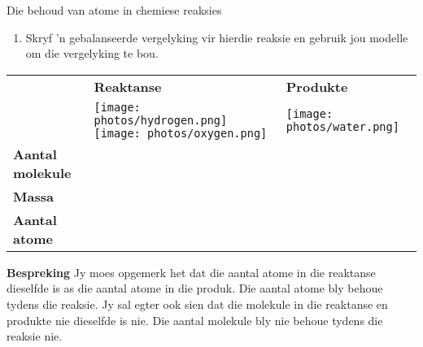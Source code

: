 \begin{activity}{Die behoud van atome in chemiese reaksies}
\begin{enumerate}[noitemsep, label=\textbf{\arabic*}. ]
\item Skryf 'n gebalanseerde vergelyking vir hierdie reaksie en gebruik jou modelle om die vergelyking te bou.
\end{enumerate}
        \par 
\begin{table}[H]
 \begin{center}
  \begin{tabular}{|l|l||l|} \hline
& \textbf{Reaktanse} & \textbf{Produkte} \\ 
& \texttt{[image: photos/hydrogen.png]} \texttt{[image: photos/oxygen.png]} & \texttt{[image: photos/water.png]} \\ \hline
   \textbf{Aantal molekule} &  &  \\ \hline
\textbf{Massa} &  &  \\ \hline
\textbf{Aantal atome} &  &  \\ \hline
  \end{tabular}

 \end{center}

\end{table}

      \label{m38711*id65031}\noindent{}\textbf{Bespreking}
Jy moes opgemerk het dat die aantal atome in die reaktanse dieselfde is as die aantal atome in die produk. Die aantal atome bly behoue tydens die reaksie. Jy sal egter ook sien dat die molekule in die reaktanse en produkte nie dieselfde is nie. Die aantal molekule bly nie behoue tydens die reaksie nie.
 \par 
\end{activity}
\label{m38711*eip-14}
